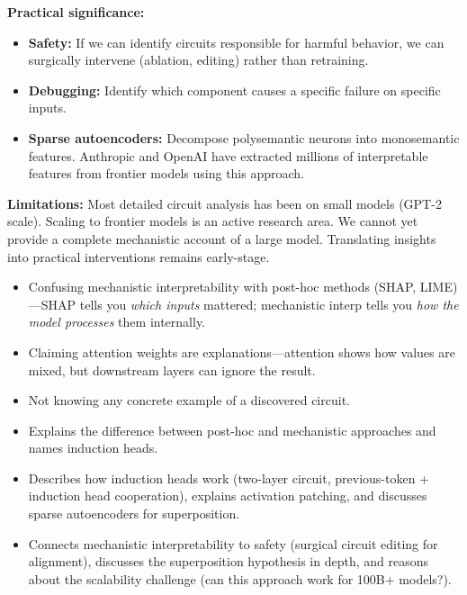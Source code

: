 \begin{interviewq}
\textbf{Practical significance:}
\begin{itemize}
    \item \textbf{Safety:} If we can identify circuits responsible for harmful behavior, we can surgically intervene (ablation, editing) rather than retraining.
    \item \textbf{Debugging:} Identify which component causes a specific failure on specific inputs.
    \item \textbf{Sparse autoencoders:} Decompose polysemantic neurons into monosemantic features. Anthropic and OpenAI have extracted millions of interpretable features from frontier models using this approach.
\end{itemize}

\textbf{Limitations:} Most detailed circuit analysis has been on small models (GPT-2 scale). Scaling to frontier models is an active research area. We cannot yet provide a complete mechanistic account of a large model. Translating insights into practical interventions remains early-stage.

\redflags
\begin{itemize}
    \item Confusing mechanistic interpretability with post-hoc methods (SHAP, LIME)---SHAP tells you \textit{which inputs} mattered; mechanistic interp tells you \textit{how the model processes} them internally.
    \item Claiming attention weights are explanations---attention shows how values are mixed, but downstream layers can ignore the result.
    \item Not knowing any concrete example of a discovered circuit.
\end{itemize}


\goodgreat
\begin{itemize}
    \item {} Explains the difference between post-hoc and mechanistic approaches and names induction heads.
    \item {} Describes how induction heads work (two-layer circuit, previous-token + induction head cooperation), explains activation patching, and discusses sparse autoencoders for superposition.
    \item {} Connects mechanistic interpretability to safety (surgical circuit editing for alignment), discusses the superposition hypothesis in depth, and reasons about the scalability challenge (can this approach work for 100B+ models?).
\end{itemize}

\end{interviewq}

